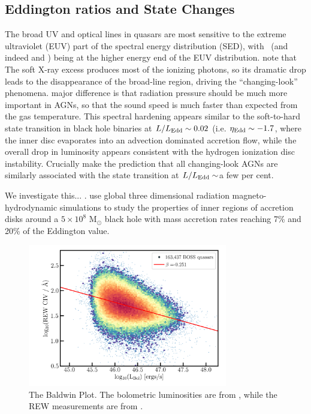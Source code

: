 \documentclass[a4paper,fleqn,usenatbib]{mnras}
\begin{document}
\subsection{Eddington ratios and State Changes} 
The broad UV and optical lines in quasars are most sensitive to the extreme ultraviolet (EUV)
part of the spectral energy distribution (SED), with \civ\ (and indeed \heii and \nv) being at
the higher energy end of the EUV distribution. 
\citet{NodaDone2018} note that The soft X-ray excess produces most of
the ionizing photons, so its dramatic drop leads to the disappearance
of the broad-line region, driving the ``changing-look'' phenomena.
major difference is that radiation pressure should be much more
important in AGNs, so that the sound speed is much faster than
expected from the gas temperature.
This spectral hardening appears similar to the soft-to-hard state
transition in black hole binaries at $L / L_{\rm Edd} \sim 0.02$
(i.e. $\eta_{\rm Edd} \sim -1.7$, where the inner disc evaporates into
an advection dominated accretion flow, while the overall drop in
luminosity appears consistent with the hydrogen ionization disc
instability.  Crucially \citet{NodaDone2018} make the prediction that
all changing-look AGNs are similarly associated with the state
transition at $L / L_{\rm Edd} \sim$a few per cent.

We investigate this...  \citet{JiangYF2014, JiangYF2016, JiangYF2019}.
\citet{JiangYF2019arXiv} use global three dimensional radiation
magneto-hydrodynamic simulations to study the properties of inner
regions of accretion disks around a $5 \times 10^{8}$ M$_{\odot}$
black hole with mass accretion rates reaching 7\% and 20\% of the
Eddington value.

\begin{figure}
  \centering
  \includegraphics[width=8.7cm, trim=0.2cm 0.2cm 0.2cm 0.2cm, clip]
  {figures/CIV_CLQs_Baldwin_LBol_20191015.png}
   \vspace{-12pt}
   \caption[]{The Baldwin Plot. The bolometric luminosities are from \citet{Kozlowski2017},
     while the REW measurements are from \citet{Hamann2017}.}
  \label{fig:REWvsFWHM}
\end{figure}
\end{document}
